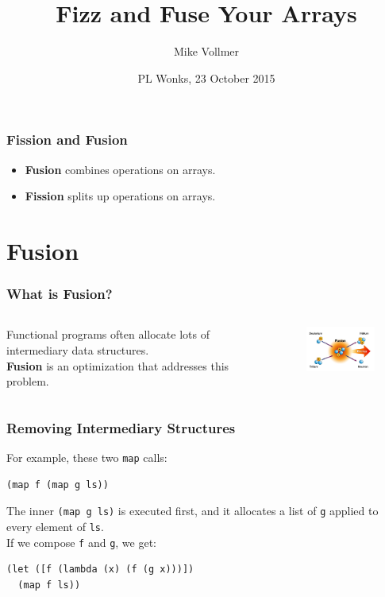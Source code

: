 \documentclass[12pt,letterpaper]{beamer}
\title{Fizz and Fuse Your Arrays}
\author{Mike Vollmer}
\institute{Indiana University}
\date{PL Wonks, 23 October 2015}
\begin{document}
\frame{\titlepage}

\begin{frame}
  \frametitle{Fission and Fusion}
  \begin{itemize}
  \item \textbf{Fusion} combines operations on arrays.
  \item \textbf{Fission} splits up operations on arrays.
  \end{itemize}
\end{frame}

\section{Fusion}

\begin{frame}
\frametitle{What is Fusion?}
\begin{columns}[c]
\begin{column}[c]{5cm}
Functional programs often allocate lots of intermediary data structures.\\
\textbf{Fusion} is an optimization that addresses this problem.
\end{column}
\begin{column}[c]{5cm}
\begin{figure}
\includegraphics[width=4cm]{whatisfusion.jpg}
\end{figure}
\end{column}
\end{columns}
\end{frame}

\begin{frame}[fragile]
\frametitle{Removing Intermediary Structures}
For example, these two {\tt map} calls:
\begin{lstlisting}
(map f (map g ls))
\end{lstlisting}
The inner {\tt (map g ls)} is executed first, and it
allocates a list of {\tt g} applied to every element of
{\tt ls}. \\
If we compose {\tt f} and {\tt g}, we get:
\begin{lstlisting}
(let ([f (lambda (x) (f (g x)))])
  (map f ls))
\end{lstlisting}
\end{frame}
\end{document}
